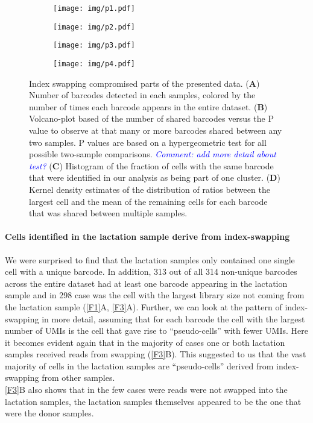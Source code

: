 \documentclass{article}
\newcommand{\comment}[1]{\textit{\textcolor{blue}{Comment: #1}}}
\begin{document}
\begin{figure}
    \begin{subfigure}[c]{0.5\textwidth}
	\texttt{[image: img/p1.pdf]}
    \caption{}
    \end{subfigure}
    \begin{subfigure}[c]{0.5\textwidth}
	\texttt{[image: img/p2.pdf]}
    \caption{}
    \end{subfigure}
    \begin{subfigure}[c]{0.5\textwidth}
	\texttt{[image: img/p3.pdf]}
    \caption{}
    \end{subfigure}
    \begin{subfigure}[c]{0.5\textwidth}
	\texttt{[image: img/p4.pdf]}
    \caption{}
    \end{subfigure}
    \caption{Index swapping compromised parts of the presented data.
	(\textbf{A}) Number of barcodes detected in each samples, colored by the number of times each barcode appears in the entire dataset.
	(\textbf{B}) Volcano-plot based of the number of shared barcodes versus the P value to observe at that many or more barcodes shared between any two samples.
	P values are based on a hypergeometric test for all possible two-sample comparisons. \comment{add more detail about test?}
	(\textbf{C}) Histogram of the fraction of cells with the same barcode that were identified in our analysis as being part of one cluster.
	(\textbf{D}) Kernel density estimates of the distribution of ratios between the largest cell and the mean of the remaining cells for each barcode that was shared between multiple samples.
    }
    \label{F2}
\end{figure}

\paragraph{Cells identified in the lactation sample derive from index-swapping}
We were surprised to find that the lactation samples only contained one single cell with a unique barcode.
In addition, 313 out of all 314 non-unique barcodes across the entire dataset had at least one barcode appearing in the lactation sample and in 298 case was the cell with the largest library size not coming from the lactation sample (\autoref{F1}A, \autoref{F3}A).
Further, we can look at the pattern of index-swapping in more detail, assuming that for each barcode the cell with the largest number of UMIs is the cell that gave rise to ``pseudo-cells'' with fewer UMIs.
Here it becomes evident again that in the majority of cases one or both lactation samples received reads from swapping (\autoref{F3}B).
This suggested to us that the vast majority of cells in the lactation samples are ``pseudo-cells'' derived from index-swapping from other samples. \\
\autoref{F3}B also shows that in the few cases were reads were not swapped into the lactation samples, the lactation samples themselves appeared to be the one that were the donor samples.
\end{document}
